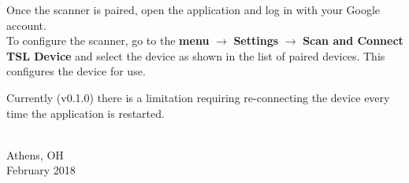 \noindent
Once the scanner is paired, open the application and log in with your Google account. \\

\noindent
To configure the scanner, go to the \textbf{menu} $\rightarrow$ \textbf{Settings} $\rightarrow$ \textbf{Scan and Connect TSL Device} and select the device as shown in the list of paired devices. This configures the device for use.

\noindent
Currently (v0.1.0) there is a limitation requiring re-connecting the device every time the application is restarted.

\vspace*{\fill}
{ \\ Athens, OH \\ February 2018\par}
